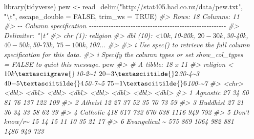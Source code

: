 \documentclass[
]{book}
\newenvironment{Shaded}{\begin{snugshade}}{\end{snugshade}}
\newcommand{\AttributeTok}[1]{\textcolor[rgb]{0.77,0.63,0.00}{#1}}
\newcommand{\CommentTok}[1]{\textcolor[rgb]{0.56,0.35,0.01}{\textit{#1}}}
\newcommand{\ConstantTok}[1]{\textcolor[rgb]{0.00,0.00,0.00}{#1}}
\newcommand{\FunctionTok}[1]{\textcolor[rgb]{0.00,0.00,0.00}{#1}}
\newcommand{\NormalTok}[1]{#1}
\newcommand{\OtherTok}[1]{\textcolor[rgb]{0.56,0.35,0.01}{#1}}
\newcommand{\SpecialCharTok}[1]{\textcolor[rgb]{0.00,0.00,0.00}{#1}}
\newcommand{\StringTok}[1]{\textcolor[rgb]{0.31,0.60,0.02}{#1}}
\begin{document}
\begin{Shaded}
\begin{Highlighting}[]
\FunctionTok{library}\NormalTok{(tidyverse)}
\NormalTok{pew }\OtherTok{\textless{}{-}} \FunctionTok{read\_delim}\NormalTok{(}\StringTok{"http://stat405.had.co.nz/data/pew.txt"}\NormalTok{, }\StringTok{"}\SpecialCharTok{\textbackslash{}t}\StringTok{"}\NormalTok{, }
  \AttributeTok{escape\_double =} \ConstantTok{FALSE}\NormalTok{, }\AttributeTok{trim\_ws =} \ConstantTok{TRUE}\NormalTok{)}
\CommentTok{\#\textgreater{} Rows: 18 Columns: 11}
\CommentTok{\#\textgreater{} {-}{-} Column specification {-}{-}{-}{-}{-}{-}{-}{-}{-}{-}{-}{-}{-}{-}{-}{-}{-}{-}{-}{-}{-}{-}{-}{-}{-}{-}{-}{-}{-}{-}{-}{-}{-}{-}{-}{-}{-}{-}{-}{-}{-}{-}{-}{-}{-}{-}{-}{-}{-}{-}{-}{-}{-}{-}{-}{-}}
\CommentTok{\#\textgreater{} Delimiter: "\textbackslash{}t"}
\CommentTok{\#\textgreater{} chr  (1): religion}
\CommentTok{\#\textgreater{} dbl (10): \textless{}$10k, $10{-}20k, $20{-}30k, $30{-}40k, $40{-}50k, $50{-}75k, $75{-}100k, $100...}
\CommentTok{\#\textgreater{} }
\CommentTok{\#\textgreater{} i Use \textasciigrave{}spec()\textasciigrave{} to retrieve the full column specification for this data.}
\CommentTok{\#\textgreater{} i Specify the column types or set \textasciigrave{}show\_col\_types = FALSE\textasciigrave{} to quiet this message.}
\NormalTok{pew}
\CommentTok{\#\textgreater{} \# A tibble: 18 x 11}
\CommentTok{\#\textgreater{}    religion      \textasciigrave{}\textless{}$10k\textasciigrave{} $10{-}2\textasciitilde{}1 $20{-}3\textasciitilde{}2 $30{-}4\textasciitilde{}3 $40{-}5\textasciitilde{}4 $50{-}7\textasciitilde{}5 $75{-}1\textasciitilde{}6 $100{-}\textasciitilde{}7}
\CommentTok{\#\textgreater{}    \textless{}chr\textgreater{}           \textless{}dbl\textgreater{}   \textless{}dbl\textgreater{}   \textless{}dbl\textgreater{}   \textless{}dbl\textgreater{}   \textless{}dbl\textgreater{}   \textless{}dbl\textgreater{}   \textless{}dbl\textgreater{}   \textless{}dbl\textgreater{}}
\CommentTok{\#\textgreater{}  1 Agnostic           27      34      60      81      76     137     122     109}
\CommentTok{\#\textgreater{}  2 Atheist            12      27      37      52      35      70      73      59}
\CommentTok{\#\textgreater{}  3 Buddhist           27      21      30      34      33      58      62      39}
\CommentTok{\#\textgreater{}  4 Catholic          418     617     732     670     638    1116     949     792}
\CommentTok{\#\textgreater{}  5 Don’t know/r\textasciitilde{}      15      14      15      11      10      35      21      17}
\CommentTok{\#\textgreater{}  6 Evangelical \textasciitilde{}     575     869    1064     982     881    1486     949     723}

\end{Highlighting}
\end{Shaded}
\end{document}
